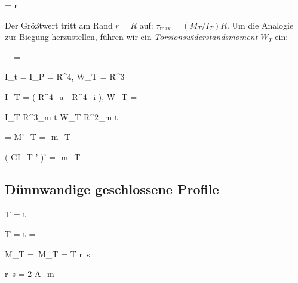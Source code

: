 \documentclass[11pt]{article}
\newcommand{\1}{ {\mathds{1}} }
\newcommand{\td}{\,\text{d}}
\begin{document}
\begin{multicols*}{3}
		\begin{formel}{5.8}
			\tau = r
		\end{formel}

		\pagebreak[0]
		Der Größtwert tritt am Rand $ r = R $ auf: $ \tau_{\text{max}} = \left( M_T / I_T \right) R $.
		Um
die Analogie zur Biegung herzustellen, führen wir ein \textit{Torsionswiderstandsmoment} $ W_T $ ein:
		\nopagebreak

		\begin{formel}{5.9}
			\tau_{} = 
		\end{formel}

		\begin{formel}{5.10}
			I_t = I_P =  R^4, \quad W_T = R^3
		\end{formel}

		\begin{formel}{5.11}
			I_T =  \left( R^4_a - R^4_i \right), \quad W_T = 
		\end{formel}

		\begin{formel}{5.12}
			I_T  \pi R^3_m t \quad W_T  \pi R^2_m t
		\end{formel}

		\begin{formel}{5.13}
			\frac{\td M_T}{\td x} = M'_T = -m_T
		\end{formel}

		\begin{formel}{5.14}
			\left( GI_T \theta' \right)' = -m_T
		\end{formel}

		\subsection{Dünnwandige geschlossene Profile}

		\begin{formel}{5.15}
			T = \tau t
		\end{formel}

		\begin{formel}{5.16}
			T = \tau t = 
		\end{formel}

		\begin{formel}{5.17}
			M_T = \oint \td M_T = T \oint r \perp\td s
		\end{formel}

		\begin{formel}{5.18}
			\oint r \perp \td s = 2 A_m
		\end{formel}


\end{multicols*}
\end{document}
